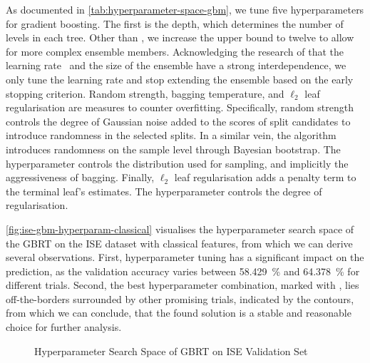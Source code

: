 As documented in \cref{tab:hyperparameter-space-gbm}, we tune five hyperparameters for gradient boosting. The first is the depth, which determines the number of levels in each tree. Other than \textcite[][]{gorishniyRevisitingDeepLearning2021}, we increase the upper bound to twelve to allow for more complex ensemble members. Acknowledging the research of \textcite[][14]{friedmanGreedyFunctionApproximation2001} that the learning rate \eta~and the size of the ensemble have a strong interdependence, we only tune the learning rate and stop extending the ensemble based on the early stopping criterion. Random strength, bagging temperature, and $\ell_2$ leaf regularisation are measures to counter overfitting. Specifically, random strength controls the degree of Gaussian noise added to the scores of split candidates to introduce randomness in the selected splits. In a similar vein, the algorithm introduces randomness on the sample level through Bayesian bootstrap. The hyperparameter controls the distribution used for sampling, and implicitly the aggressiveness of bagging. Finally, $\ell_2$ leaf regularisation adds a penalty term to the terminal leaf's estimates. The hyperparameter controls the degree of regularisation.

\cref{fig:ise-gbm-hyperparam-classical} visualises the hyperparameter search space of the \gls{GBRT} on the \gls{ISE} dataset with classical features, from which we can derive several observations. First, hyperparameter tuning has a significant impact on the prediction, as the validation accuracy varies between \SI{58.429}{\percent} and \SI{64.378}{\percent} for different trials. Second, the best hyperparameter combination, marked with \bestcircle, lies off-the-borders surrounded by other promising trials, indicated by the contours, from which we can conclude, that the found solution is a stable and reasonable choice for further analysis.

\begin{figure}[!h]
    \vfill
\end{figure}
\clearpage
\begin{figure}[!ht]
    \addtocounter{figure}{-1}
    \caption[Hyperparameter Search Space of Gradient-Boosting]{Hyperparameter Search Space of \gls{GBRT} on \gls{ISE} Validation Set}
    \label{fig:ise-gbm-hyperparam}
\end{figure}

